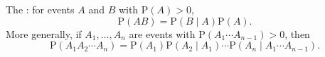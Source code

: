 The : for events $A$ and $B$ with $\text{P}(A) > 0$,
$$\text{P}(AB) = \text{P}(B \mid A) \text{P}(A).$$
More generally, if $A_1, \ldots, A_n$ are events with $\text{P}(A_1 \cdots A_{n-1}) > 0$, then
$$\text{P}(A_1 A_2 \cdots A_n) = \text{P}(A_1) \text{P}(A_2 \mid A_1) \cdots \text{P}(A_n \mid A_1 \cdots A_{n-1}).$$
